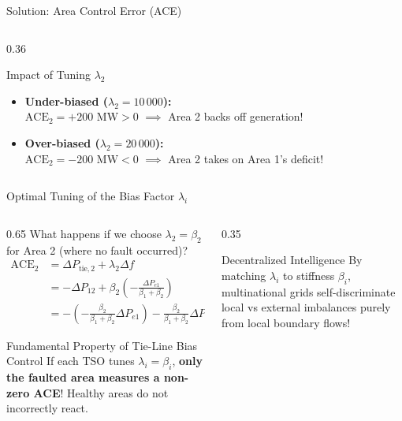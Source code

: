 \begin{frame}{Solution: Area Control Error (ACE)}
\begin{columns}[T]
\begin{column}{0.36\textwidth}
\begin{block}{Impact of Tuning $\lambda_2$}
\begin{itemize}
        $\text{ACE}_2 = 0\text{ MW}$ $\implies$ zero secondary intervention.
        \item \textbf{Under-biased ($\lambda_2 = 10\,000$):}\\
        $\text{ACE}_2 = +200\text{ MW} > 0$ $\implies$ Area 2 backs off generation!
        \item \textbf{Over-biased ($\lambda_2 = 20\,000$):}\\
        $\text{ACE}_2 = -200\text{ MW} < 0$ $\implies$ Area 2 takes on Area 1's deficit!
    \end{itemize}
    \end{block}
\end{column}
\end{columns}
\end{frame}

\begin{frame}{Optimal Tuning of the Bias Factor $\lambda_i$}
\begin{columns}[T]
\begin{column}{0.65\textwidth}
    \footnotesize
    What happens if we choose $\lambda_2 = \beta_2$ for Area 2 (where no fault occurred)?
    \begin{align*}
        \text{ACE}_2 &= \Delta P_{\text{tie},2} + \lambda_2 \Delta f \\
                     &= - \Delta P_{12} + \beta_2 \left( - \frac{\Delta P_{e1}}{\beta_1 + \beta_2} \right) \\
                     &= - \left( - \frac{\beta_2}{\beta_1 + \beta_2}\Delta P_{e1} \right) - \frac{\beta_2}{\beta_1 + \beta_2}\Delta P_{e1} = 0!
    \end{align*}
    \begin{alertblock}{Fundamental Property of Tie-Line Bias Control}
    If each TSO tunes $\lambda_i = \beta_i$, \textbf{only the faulted area measures a non-zero ACE}! Healthy areas do not incorrectly react.
    \end{alertblock}
\end{column}
\begin{column}{0.35\textwidth}
    \begin{block}{Decentralized Intelligence}
    \scriptsize
    By matching $\lambda_i$ to stiffness $\beta_i$, multinational grids self-discriminate local vs external imbalances purely from local boundary flows!
    \end{block}
\end{column}
\end{columns}
\end{frame}

